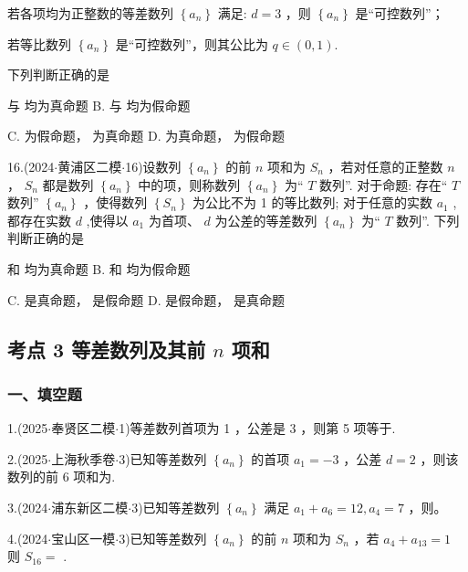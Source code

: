    若各项均为正整数的等差数列 $\left\{  {a}_{n}\right\}$ 满足: $d = 3$ ，则 $\left\{  {a}_{n}\right\}$ 是“可控数列”；

   若等比数列 $\left\{  {a}_{n}\right\}$ 是“可控数列”，则其公比为 $q \in  \left( {0,1}\right)$.

下列判断正确的是 \dotfill{(\kh{})}

\xx{}{}{}{}  与  均为真命题 B.   与  均为假命题

C.   为假命题，  为真命题 D.   为真命题，  为假命题

16.(2024$\cdot$黄浦区二模$\cdot$16)设数列 $\left\{  {a}_{n}\right\}$ 的前 $n$ 项和为 ${S}_{n}$ ，若对任意的正整数 $n$ ， ${S}_{n}$ 都是数列 $\left\{  {a}_{n}\right\}$ 中的项，则称数列 $\left\{  {a}_{n}\right\}$ 为“ $T$ 数列”. 对于命题:   存在“ $T$ 数列” $\left\{  {a}_{n}\right\}$ ，使得数列 $\left\{  {S}_{n}\right\}$ 为公比不为 1 的等比数列;    对于任意的实数 ${a}_{1}$ ,都存在实数 $d$ ,使得以 ${a}_{1}$ 为首项、 $d$ 为公差的等差数列 $\left\{  {a}_{n}\right\}$ 为“ $T$ 数列”. 下列判断正确的是 \dotfill{(\kh{})}

\xx{}{}{}{}  和  均为真命题 B.   和  均为假命题

C.   是真命题，  是假命题 D.   是假命题，  是真命题

\subsection*{考点 3 等差数列及其前 $n$ 项和}

\subsubsection*{一、填空题}

1.(2025$\cdot$奉贤区二模$\cdot$1)等差数列首项为 1 ，公差是 3 ，则第 5 项等于\blkda[2]{}.

2.(2025$\cdot$上海秋季卷$\cdot$3)已知等差数列 $\left\{  {a}_{n}\right\}$ 的首项 ${a}_{1} =  - 3$ ，公差 $d = 2$ ，则该数列的前 6 项和为\blkda[2]{}.

3.(2024$\cdot$浦东新区二模$\cdot$3)已知等差数列 $\left\{  {a}_{n}\right\}$ 满足 ${a}_{1} + {a}_{6} = {12},{a}_{4} = 7$ ，则\blkda[2]{}。

4.(2024$\cdot$宝山区一模$\cdot$3)已知等差数列 $\left\{  {a}_{n}\right\}$ 的前 $n$ 项和为 ${S}_{n}$ ，若 ${a}_{4} + {a}_{13} = 1$ 则 ${S}_{16} =$ \blkda[2]{}.

